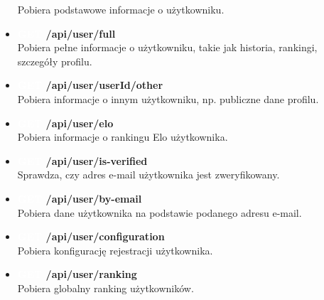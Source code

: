 \documentclass[12pt,a4paper]{article}
\begin{document}
\begin{itemize}
    Pobiera podstawowe informacje o użytkowniku. 
    \item \textbf{\colorbox{cyan!90}{\textcolor{white}{GET}} /api/user/full} \\
    Pobiera pełne informacje o użytkowniku, takie jak historia, rankingi, szczegóły profilu. 
    \item \textbf{\colorbox{cyan!90}{\textcolor{white}{GET}} /api/user/{userId}/other} \\
    Pobiera informacje o innym użytkowniku, np. publiczne dane profilu. 
    \item \textbf{\colorbox{cyan!90}{\textcolor{white}{GET}} /api/user/elo} \\
    Pobiera informacje o rankingu Elo użytkownika. 
    \item \textbf{\colorbox{cyan!90}{\textcolor{white}{GET}} /api/user/is-verified} \\
    Sprawdza, czy adres e-mail użytkownika jest zweryfikowany. 
    \item \textbf{\colorbox{cyan!90}{\textcolor{white}{GET}} /api/user/by-email} \\
    Pobiera dane użytkownika na podstawie podanego adresu e-mail. 
    \item \textbf{\colorbox{cyan!90}{\textcolor{white}{GET}} /api/user/configuration} \\
    Pobiera konfigurację rejestracji użytkownika. 
    \item \textbf{\colorbox{cyan!90}{\textcolor{white}{GET}} /api/user/ranking} \\
    Pobiera globalny ranking użytkowników. 
\end{itemize}

\newpage
\end{document}
